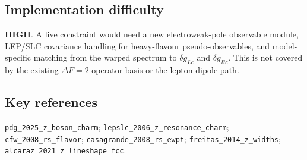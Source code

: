 \subsection*{Implementation difficulty}
\textbf{HIGH}.  A live constraint would need a new electroweak-pole observable
module, LEP/SLC covariance handling for heavy-flavour pseudo-observables, and
model-specific matching from the warped spectrum to \(\delta g_{Lc}\) and
\(\delta g_{Rc}\).  This is not covered by the existing \(\Delta F=2\) operator
basis or the lepton-dipole path.

\subsection*{Key references}
\texttt{pdg\_2025\_z\_boson\_charm}; \texttt{lepslc\_2006\_z\_resonance\_charm};
\texttt{cfw\_2008\_rs\_flavor}; \texttt{casagrande\_2008\_rs\_ewpt};
\texttt{freitas\_2014\_z\_widths}; \texttt{alcaraz\_2021\_z\_lineshape\_fcc}.

